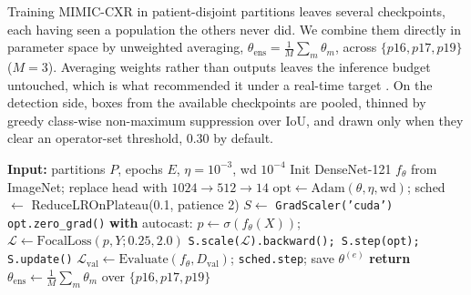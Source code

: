 \documentclass[conference]{IEEEtran}
\begin{document}
Training MIMIC-CXR in patient-disjoint partitions leaves several checkpoints,
each having seen a population the others never did. We combine them directly in
parameter space by unweighted averaging, $\theta_{\mathrm{ens}} =
\frac{1}{M}\sum_m \theta_m$, across $\{p16, p17, p19\}$ ($M = 3$). Averaging
weights rather than outputs leaves the inference budget untouched, which is what
recommended it under a real-time target \cite{izmailov2018}. On the detection
side, boxes from the available checkpoints are pooled, thinned by greedy
class-wise non-maximum suppression over IoU, and drawn only when they clear an
operator-set threshold, 0.30 by default.

\begin{algorithm}[!t]
\caption{Focal-Loss multi-label training with AMP}
\label{alg:train}
\begin{algorithmic}[1]
\STATE \textbf{Input:} partitions $P$, epochs $E$, $\eta = 10^{-3}$, wd $10^{-4}$
\STATE Init DenseNet-121 $f_\theta$ from ImageNet; replace head with $1024{\to}512{\to}14$
\STATE $\mathrm{opt} \leftarrow \mathrm{Adam}(\theta, \eta, \mathrm{wd})$; sched $\leftarrow$ ReduceLROnPlateau(0.1, patience 2)
\STATE $S \leftarrow$ \texttt{GradScaler('cuda')}
    \STATE \texttt{opt.zero\_grad()}
    \STATE \textbf{with} autocast: $p \leftarrow \sigma(f_\theta(X))$; $\mathcal{L} \leftarrow \mathrm{FocalLoss}(p, Y; 0.25, 2.0)$
    \STATE \texttt{S.scale($\mathcal{L}$).backward(); S.step(opt); S.update()}
  \ENDFOR
  \STATE $\mathcal{L}_{\mathrm{val}} \leftarrow \mathrm{Evaluate}(f_\theta, D_{\mathrm{val}})$; \texttt{sched.step}; save $\theta^{(e)}$
\ENDFOR
\STATE \textbf{return} $\theta_{\mathrm{ens}} \leftarrow \frac{1}{M}\sum_m \theta_m$ over $\{p16, p17, p19\}$
\end{algorithmic}
\end{algorithm}
\end{document}
